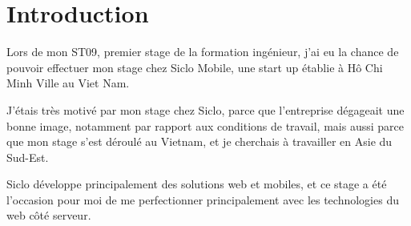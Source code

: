 \documentclass[main.tex]{subfiles}
\begin{document}
    \section*{Introduction}
    Lors de mon ST09, premier stage de la formation ingénieur,
    j'ai eu la chance de pouvoir effectuer mon stage chez Siclo Mobile,
    une start up établie à Hô Chi Minh Ville au Viet Nam.

    J'étais très motivé par mon stage chez Siclo, parce que l'entreprise dégageait une bonne image, notamment par rapport aux conditions de travail, mais aussi parce que mon stage s'est déroulé au Vietnam, et je cherchais à travailler en Asie du Sud-Est.

    Siclo développe principalement des solutions web et mobiles, et ce stage a été l'occasion pour moi de me perfectionner principalement avec les technologies du web côté serveur.
\end{document}
